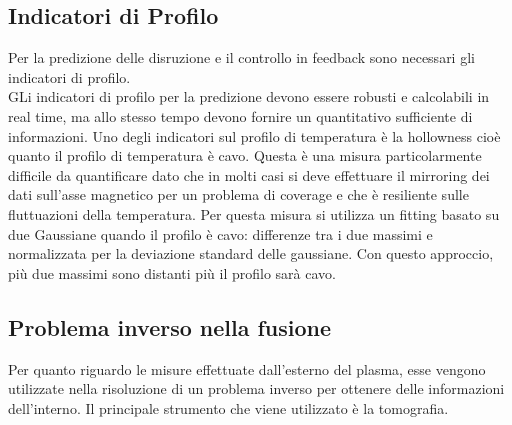 \documentclass{article}
\begin{document}
\subsection{Indicatori di Profilo}
Per la predizione delle disruzione e il controllo in feedback sono necessari gli indicatori di profilo.\\ GLi indicatori di profilo per la predizione devono essere robusti e calcolabili in real time, ma allo stesso tempo devono fornire  un quantitativo sufficiente di informazioni. Uno degli indicatori sul profilo di temperatura è la hollowness cioè quanto il profilo di temperatura è cavo. Questa è una misura particolarmente difficile da quantificare dato che in molti casi si deve effettuare il mirroring dei dati sull'asse magnetico per un problema di coverage e che è resiliente sulle fluttuazioni della temperatura.\newline
Per questa misura si utilizza un fitting basato su due Gaussiane quando il profilo è cavo: differenze tra i due massimi e normalizzata per la deviazione standard delle  gaussiane. Con questo approccio, più due massimi sono distanti più il profilo sarà cavo.
\subsection{Problema inverso nella fusione}
Per quanto riguardo le misure effettuate dall'esterno del plasma, esse vengono utilizzate nella risoluzione di un problema inverso per ottenere delle informazioni dell'interno. Il principale strumento che viene utilizzato è la tomografia.
\end{document}
